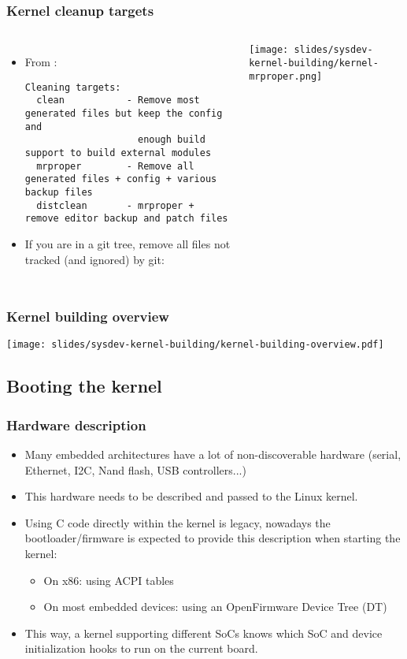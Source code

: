 \begin{frame}[fragile]
  \frametitle{Kernel cleanup targets}
  \begin{columns}[T]
    \small
    \begin{itemize}
    \item From :
    \begin{block}{}
    \begin{verbatim}
Cleaning targets:
  clean           - Remove most generated files but keep the config and
                    enough build support to build external modules
  mrproper        - Remove all generated files + config + various backup files
  distclean       - mrproper + remove editor backup and patch files
     \end{verbatim}
     \end{block}
    \item If you are in a git tree, remove all files not tracked (and
      ignored) by git:\\
    \end{itemize}
    \texttt{[image: slides/sysdev-kernel-building/kernel-mrproper.png]}
  \end{columns}
\end{frame}

\begin{frame}
  \frametitle{Kernel building overview}
  \begin{center}
    \texttt{[image: slides/sysdev-kernel-building/kernel-building-overview.pdf]}
  \end{center}
\end{frame}

\subsection{Booting the kernel}

\begin{frame}
  \frametitle{Hardware description}
  \begin{itemize}
  \item Many embedded architectures have a lot of non-discoverable
    hardware (serial, Ethernet, I2C, Nand flash, USB controllers...)
  \item This hardware needs to be described and passed to the Linux
    kernel.
  \item Using C code directly within the kernel is legacy, nowadays the
    bootloader/firmware is expected to provide this description when
    starting the kernel:
    \begin{itemize}
    \item On x86: using ACPI tables
    \item On most embedded devices: using an OpenFirmware Device Tree
      (DT)
    \end{itemize}
  \item This way, a kernel supporting different SoCs knows which
    SoC and device initialization hooks to run on the current board.
  \end{itemize}
\end{frame}
